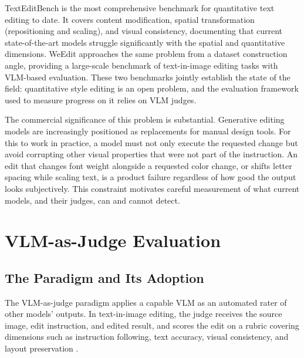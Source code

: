 TextEditBench \cite{gui2025texteditbench} is the most comprehensive benchmark for quantitative text editing to date. It covers content modification, spatial transformation (repositioning and scaling), and visual consistency, documenting that current state-of-the-art models struggle significantly with the spatial and quantitative dimensions. WeEdit \cite{zhang2026weedit} approaches the same problem from a dataset construction angle, providing a large-scale benchmark of text-in-image editing tasks with VLM-based evaluation. These two benchmarks jointly establish the state of the field: quantitative style editing is an open problem, and the evaluation framework used to measure progress on it relies on VLM judges.

The commercial significance of this problem is substantial. Generative editing models are increasingly positioned as replacements for manual design tools. For this to work in practice, a model must not only execute the requested change but avoid corrupting other visual properties that were not part of the instruction. An edit that changes font weight alongside a requested color change, or shifts letter spacing while scaling text, is a product failure regardless of how good the output looks subjectively. This constraint motivates careful measurement of what current models, and their judges, can and cannot detect.


\section{VLM-as-Judge Evaluation}

\label{VLM-as-Judge Evaluation}

\subsection{The Paradigm and Its Adoption}

The VLM-as-judge paradigm applies a capable VLM as an automated rater of other models' outputs. In text-in-image editing, the judge receives the source image, edit instruction, and edited result, and scores the edit on a rubric covering dimensions such as instruction following, text accuracy, visual consistency, and layout preservation \cite{gui2025texteditbench, zhang2026weedit}. %


